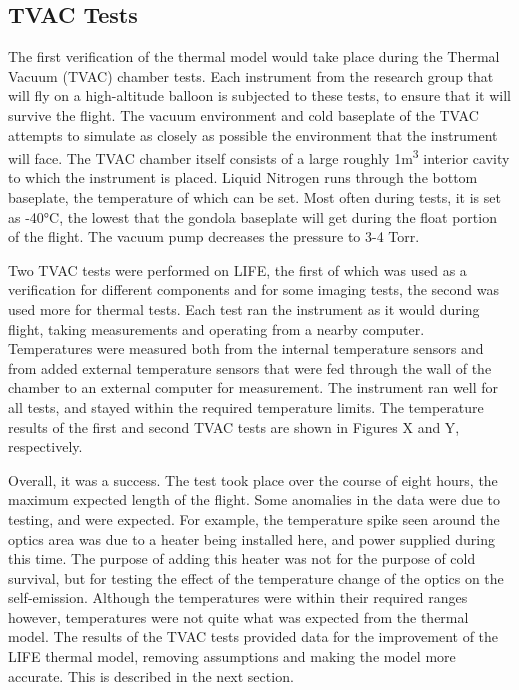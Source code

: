 \subsection{TVAC Tests}\label{TVAC_tests}
The first verification of the thermal model would take place during the Thermal Vacuum (TVAC) chamber tests. Each instrument from the research group that will fly on a high-altitude balloon is subjected to these tests, to ensure that it will survive the flight. The vacuum environment and cold baseplate of the TVAC attempts to simulate as closely as possible the environment that the instrument will face. The TVAC chamber itself consists of a large roughly 1m\textsuperscript{3} interior cavity to which the instrument is placed. Liquid Nitrogen runs through the bottom baseplate, the temperature of which can be set. Most often during tests, it is set as -40°C, the lowest that the gondola baseplate will get during the float portion of the flight. The vacuum pump decreases the pressure to 3-4 Torr.

Two TVAC tests were performed on LIFE, the first of which was used as a verification for different components and for some imaging tests, the second was used more for thermal tests. Each test ran the instrument as it would during flight, taking measurements and operating from a nearby computer. Temperatures were measured both from the internal temperature sensors and from added external temperature sensors that were fed through the wall of the chamber to an external computer for measurement. The instrument ran well for all tests, and stayed within the required temperature limits. The temperature results of the first and second TVAC tests are shown in Figures X and Y, respectively.

Overall, it was a success. The test took place over the course of eight hours, the maximum expected length of the flight. Some anomalies in the data were due to testing, and were expected. For example, the temperature spike seen around the optics area was due to a heater being installed here, and power supplied during this time. The purpose of adding this heater was not for the purpose of cold survival, but for testing the effect of the temperature change of the optics on the self-emission. Although the temperatures were within their required ranges however, temperatures were not quite what was expected from the thermal model. The results of the TVAC tests provided data for the improvement of the LIFE thermal model, removing assumptions and making the model more accurate. This is described in the next section.

